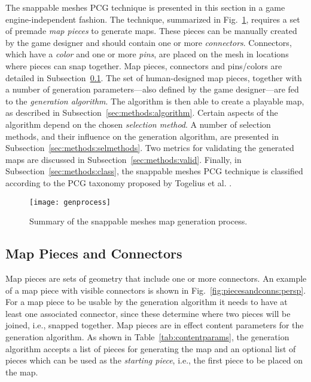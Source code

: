 \documentclass[journal]{IEEEtran}
\begin{document}
The snappable meshes PCG technique is presented in this section in a game
engine-independent fashion. The technique, summarized in Fig.~\ref{fig:methodsummary},
requires a set of premade \emph{map pieces} to generate maps. These pieces can be
manually created by the game designer and should contain one or more \textit{connectors}.
Connectors, which have a \emph{color} and one or more \emph{pins}, are placed on
the mesh in locations where pieces can snap together. Map pieces, connectors
and pins/colors are detailed in Subsection~\ref{sec:methods:pieces}. The set of
human-designed map pieces, together with a number of generation parameters---also
defined by the game designer---are fed to the \emph{generation algorithm}.
The algorithm is then able to create a playable map, as described in
Subsection~\ref{sec:methods:algorithm}. Certain aspects of the algorithm depend
on the chosen \emph{selection method}. A number of selection methods, and
their influence on the generation algorithm, are presented in
Subsection~\ref{sec:methods:selmethods}. Two metrics for validating the generated
maps are discussed in Subsection~\ref{sec:methods:valid}. Finally, in
Subsection~\ref{sec:methods:class}, the snappable meshes PCG technique is
classified according to the PCG taxonomy proposed by Togelius et al.
\cite{togelius2016intro}.

\begin{figure}[!t]
  \centering
  \texttt{[image: genprocess]}
  \caption{Summary of the snappable meshes map generation process.}
  \label{fig:methodsummary}
\end{figure}

\subsection{Map Pieces and Connectors}
\label{sec:methods:pieces}

Map pieces are sets of geometry that include one or more connectors. An example of a
map piece with visible connectors is shown in Fig.~\ref{fig:piecesandconns:persp}.
For a map piece to be usable by the generation algorithm it needs to have at least
one associated connector, since these determine where two pieces will be joined, i.e.,
snapped together. Map pieces are in effect content parameters for the generation algorithm.
As shown in Table~\ref{tab:contentparams}, the generation algorithm accepts a list
of pieces for generating the map and an optional list of pieces which can be
used as the \emph{starting piece}, i.e., the first piece to be placed on the map.
\end{document}
